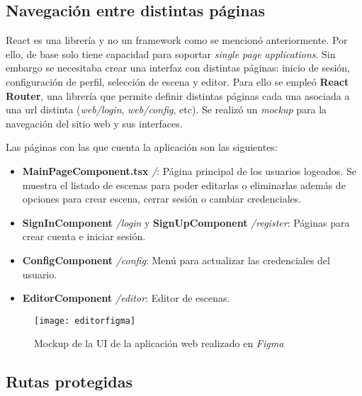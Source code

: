 \subsection{Navegación entre distintas páginas}

React es una librería y no un framework como se mencionó anteriormente. Por ello, de base solo tiene capacidad para soportar \textit{single page applications}. Sin embargo se necesitaba crear una interfaz con distintas páginas: inicio de sesión, configuración de perfil, selección de escena y editor. Para ello se empleó \textbf{React Router}\cite{reactrouter}, una librería que permite definir distintas páginas cada una asociada a una url distinta (\textit{web/login}, \textit{web/config}, etc). Se realizó un \textit{mockup} para la navegación del sitio web y sus interfaces.

Las páginas con las que cuenta la aplicación son las siguientes:

\begin{itemize}
    \item \textbf{MainPageComponent.tsx} \textit{/}: Página principal de los usuarios logeados. Se muestra el listado de escenas para poder editarlas o eliminarlas además de opciones para crear escena, cerrar sesión o cambiar credenciales.
    \item \textbf{SignInComponent} \textit{/login} y \textbf{SignUpComponent} \textit{/register}: Páginas para crear cuenta e iniciar sesión.
    \item \textbf{ConfigComponent} \textit{/config}: Menú para actualizar las credenciales del usuario.
    \item \textbf{EditorComponent} \textit{/editor}: Editor de escenas.
\end{itemize}

\begin{figure}[h]
    \centering
    \texttt{[image: editorfigma]}
    \caption[Mockup de la UI de la aplicación web]{Mockup de la UI de la aplicación web realizado en \textit{Figma}}
\end{figure}

\subsection{Rutas protegidas}

